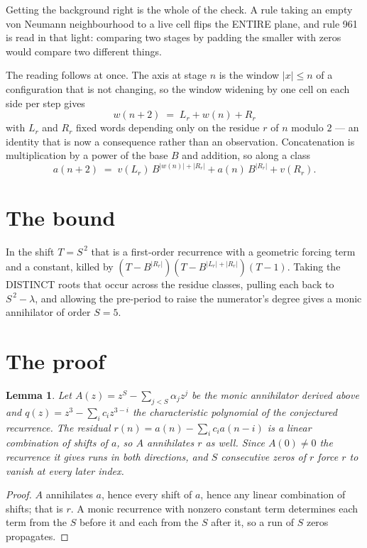 \documentclass[11pt,a4paper]{article}
\theoremstyle{plain}
\newtheorem{lemma}[theorem]{Lemma}
\theoremstyle{definition}
\begin{document}
Getting the background right is the whole of the check. A rule taking an empty von Neumann
neighbourhood to a live cell flips the ENTIRE plane, and rule 961 is read
in that light: comparing two stages by padding the smaller with zeros would compare two
different things.

The reading follows at once. The axis at stage $n$ is the window $|x|\le n$ of a configuration
that is not changing, so the window widening by one cell on each side per step gives
\[
w(n+2)\;=\;L_r + w(n) + R_r
\]
with $L_r$ and $R_r$ fixed words depending only on the residue $r$ of $n$ modulo $2$ --- an
identity that is now a consequence rather than an observation. Concatenation is multiplication
by a power of the base $B$ and addition, so along a class
\[
a(n+2)\;=\;v(L_r)\,B^{|w(n)|+|R_r|} + a(n)\,B^{|R_r|} + v(R_r).
\]

\section{The bound}

In the shift $T=S^{\,2}$ that is a first-order recurrence with a geometric forcing term and a
constant, killed by $(T-B^{|R_r|})(T-B^{|L_r|+|R_r|})(T-1)$. Taking the DISTINCT roots that
occur across the residue classes, pulling each back to $S^{\,2}-\lambda$, and allowing the
pre-period to raise the numerator's degree gives a monic annihilator of order $S=5$.

\section{The proof}

\begin{lemma}\label{lem:crit}
Let $A(z)=z^S-\sum_{j<S}\alpha_jz^{j}$ be the monic annihilator derived above and
$q(z)=z^{3}-\sum_ic_iz^{3-i}$ the characteristic polynomial of the conjectured
recurrence. The residual $r(n)=a(n)-\sum_ic_ia(n-i)$ is a linear combination of shifts of $a$,
so $A$ annihilates $r$ as well. Since $A(0)\ne0$ the recurrence it gives runs in both
directions, and $S$ consecutive zeros of $r$ force $r$ to vanish at every later index.
\end{lemma}

\begin{proof}
$A$ annihilates $a$, hence every shift of $a$, hence any linear combination of shifts; that is
$r$. A monic recurrence with nonzero constant term determines each term from the $S$ before it
and each from the $S$ after it, so a run of $S$ zeros propagates.
\end{proof}
\end{document}
